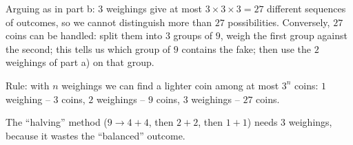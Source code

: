 {
Arguing as in part b: $3$ weighings give at most $3\times 3\times 3 = 27$ different sequences of outcomes, so we cannot distinguish more
than $27$ possibilities. Conversely, $27$ coins can be handled: split them into $3$ groups of $9$, weigh the first group against the
second; this tells us which group of $9$ contains the fake; then use the $2$ weighings of part a) on that group.
\begin{tipbox}Rule: with $n$ weighings we can find a lighter coin among at most $3^n$ coins: $1$ weighing -- $3$ coins, $2$ weighings --
$9$ coins, $3$ weighings -- $27$ coins.\end{tipbox}
\begin{warnbox}The ``halving'' method ($9 \to 4 + 4$, then $2 + 2$, then $1 + 1$) needs $3$ weighings, because it wastes the
``balanced'' outcome.\end{warnbox}
}

